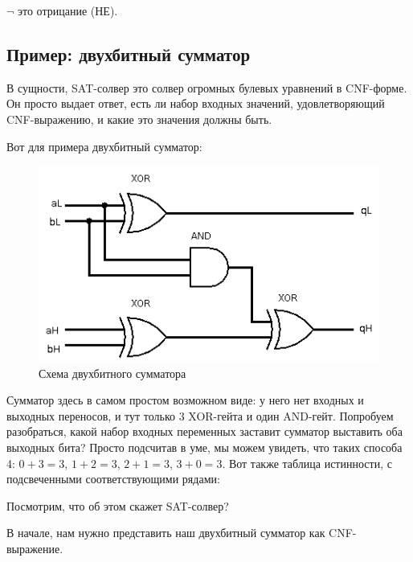 $\neg$ это отрицание (НЕ).


\subsection{Пример: двухбитный сумматор}
\label{adder}

В сущности, \ac{SAT}-солвер это солвер огромных булевых уравнений в CNF-форме.
Он просто выдает ответ, есть ли набор входных значений, удовлетворяющий CNF-выражению, и какие это значения должны быть.

Вот для примера двухбитный сумматор:

\begin{figure}[ht!]
\centering
\includegraphics[scale=0.75]{SAT/adder_logisim.png}
\caption{Схема двухбитного сумматора}
\end{figure}

Сумматор здесь в самом простом возможном виде: у него нет входных и выходных переносов, и тут только 3 XOR-гейта
и один AND-гейт.
Попробуем разобраться, какой набор входных переменных заставит сумматор выставить оба выходных бита?
Просто подсчитав в уме, мы можем увидеть, что таких способа 4: $0+3=3$, $1+2=3$, $2+1=3$, $3+0=3$.
Вот также таблица истинности, с подсвеченными соответствующими рядами:



Посмотрим, что об этом скажет SAT-солвер?

В начале, нам нужно представить наш двухбитный сумматор как CNF-выражение.

